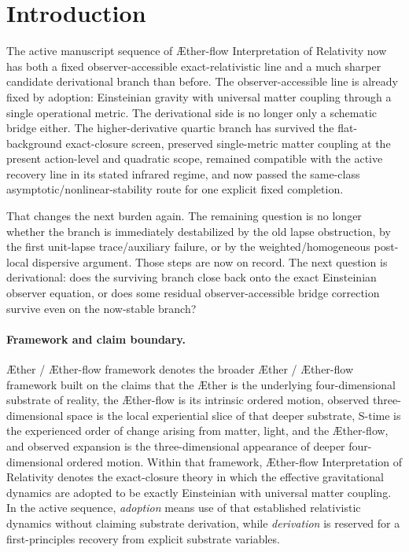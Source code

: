 \documentclass[11pt]{article}
\newcommand{\Aether}{\AE{}ther}
\newcommand{\Aflow}{\AE{}ther-flow}
\newcommand{\TheoryName}{\Aflow{} Interpretation of Relativity}
\newcommand{\TheoryProgram}{\Aether{} / \Aflow{} framework}
\begin{document}
\section{Introduction}

The active manuscript sequence of \TheoryName{} now has both a fixed observer-accessible exact-relativistic line and a much sharper candidate derivational branch than before. The observer-accessible line is already fixed by adoption: Einsteinian gravity with universal matter coupling through a single operational metric. The derivational side is no longer only a schematic bridge either. The higher-derivative quartic branch has survived the flat-background exact-closure screen, preserved single-metric matter coupling at the present action-level and quadratic scope, remained compatible with the active recovery line in its stated infrared regime, and now passed the same-class asymptotic/nonlinear-stability route for one explicit fixed completion.

That changes the next burden again. The remaining question is no longer whether the branch is immediately destabilized by the old lapse obstruction, by the first unit-lapse trace/auxiliary failure, or by the weighted/homogeneous post-local dispersive argument. Those steps are now on record. The next question is derivational: does the surviving branch close back onto the exact Einsteinian observer equation, or does some residual observer-accessible bridge correction survive even on the now-stable branch?

\paragraph{Framework and claim boundary.}
\TheoryProgram{} denotes the broader \Aether{} / \Aflow{} framework built on the claims that the \Aether{} is the underlying four-dimensional substrate of reality, the \Aflow{} is its intrinsic ordered motion, observed three-dimensional space is the local experiential slice of that deeper substrate, S-time is the experienced order of change arising from matter, light, and the \Aflow{}, and observed expansion is the three-dimensional appearance of deeper four-dimensional ordered motion. Within that framework, \TheoryName{} denotes the exact-closure theory in which the effective gravitational dynamics are adopted to be exactly Einsteinian with universal matter coupling. In the active sequence, \emph{adoption} means use of that established relativistic dynamics without claiming substrate derivation, while \emph{derivation} is reserved for a first-principles recovery from explicit substrate variables.
\end{document}
